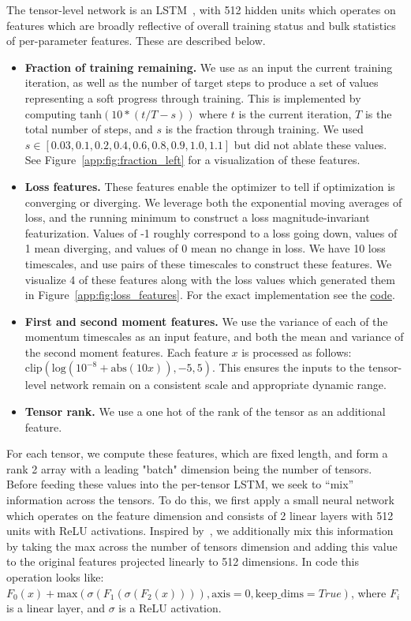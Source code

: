\documentclass[11pt]{article}
\begin{document}
The tensor-level network is an LSTM~\citep{hochreiter1997long}, with 512 hidden units which operates on features which are broadly reflective of overall training status and bulk statistics of per-parameter features. These are described below.
\begin{itemize}
    \item \textbf{Fraction of training remaining.} We use as an input the current training iteration, as well as the number of target steps to produce a set of values representing a soft progress through training. This is implemented by computing $\text{tanh}(10*(t/T - s))$ where $t$ is the current iteration, $T$ is the total number of steps, and $s$ is the fraction through training. We used $s \in [0.03, 0.1, 0.2, 0.4, 0.6, 0.8, 0.9, 1.0, 1.1]$ but did not ablate these values. See Figure~\ref{app:fig:fraction_left} for a visualization of these features.
    \item \textbf{Loss features.} These features enable the optimizer to tell if optimization is converging or diverging.
    We leverage both the exponential moving averages of loss, and the running minimum to construct a loss magnitude-invariant featurization.
    Values of -1 roughly correspond to a loss going down, values of 1 mean diverging, and values of 0 mean no change in loss.
    We have 10 loss timescales, and use pairs of these timescales to construct these features.
    We visualize 4 of these features along with the loss values which generated them in Figure~\ref{app:fig:loss_features}.
    For the exact implementation see the \href{https://github.com/google/learned_optimization/blob/687e72e7b5596dfb80c5196fd51f43058899edd9/learned_optimization/research/general_lopt/hyper_v2.py#L80}{code}.
    \item \textbf{First and second moment features.} We use the variance of each of the momentum timescales as an input feature, and both the mean and variance of the second moment features. Each feature $x$ is processed as follows: $\text{clip}(\text{log}(10^{-8} + \text{abs}(10x)), -5, 5)$. This ensures the inputs to the tensor-level network remain on a consistent scale and appropriate dynamic range.
    \item \textbf{Tensor rank.} We use a one hot of the rank of the tensor as an additional feature.
\end{itemize}


For each tensor, we compute these features, which are fixed length, and form a rank 2 array with a leading "batch" dimension being the number of tensors.
Before feeding these values into the per-tensor LSTM, we seek to ``mix'' information across the tensors.
To do this, we first apply a small neural network which operates on the feature dimension and consists of 2 linear layers with 512 units with ReLU activations.
Inspired by~\citet{zaheer2017deep}, we additionally mix this information by taking the max across the number of tensors dimension and adding this value to the original features projected linearly to 512 dimensions.
In code this operation looks like: $F_0(x) + \text{max}(\sigma(F_1(\sigma(F_2(x)))), \text{axis}=0, \text{keep\_dims}=True)$, where $F_i$ is a linear layer, and $\sigma$ is a ReLU activation.
\end{document}
